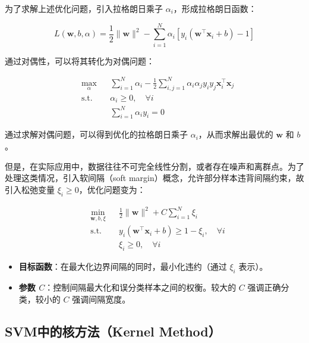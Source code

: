 \documentclass[a4paper,11pt,AutoFakeBold]{ctexart}
\begin{document}
为了求解上述优化问题，引入拉格朗日乘子 $\alpha_i$，形成拉格朗日函数：

\begin{equation}
L(\mathbf{w}, b, \alpha) = \frac{1}{2} \|\mathbf{w}\|^2 - \sum_{i=1}^N \alpha_i \left[ y_i (\mathbf{w}^\top \mathbf{x}_i + b) - 1 \right]
\end{equation}

通过对偶性，可以将其转化为对偶问题：

\begin{equation}
\begin{aligned}
& \underset{\alpha}{\text{max}} && \sum_{i=1}^N \alpha_i - \frac{1}{2} \sum_{i,j=1}^N \alpha_i \alpha_j y_i y_j \mathbf{x}_i^\top \mathbf{x}_j \\
& \text{s.t.} && \alpha_i \geq 0, \quad \forall i \\
& && \sum_{i=1}^N \alpha_i y_i = 0
\end{aligned}
\end{equation}

通过求解对偶问题，可以得到优化的拉格朗日乘子 $\alpha_i$，从而求解出最优的 $\mathbf{w}$ 和 $b$。

但是，在实际应用中，数据往往不可完全线性分割，或者存在噪声和离群点。为了处理这类情况，引入软间隔（soft margin）概念，允许部分样本违背间隔约束，故引入松弛变量 $\xi_i \geq 0$，优化问题变为：

\begin{equation}
\begin{aligned}
& \underset{\mathbf{w}, b, \xi}{\text{min}} && \frac{1}{2} \|\mathbf{w}\|^2 + C \sum_{i=1}^N \xi_i \\
& \text{s.t.} && y_i (\mathbf{w}^\top \mathbf{x}_i + b) \geq 1 - \xi_i, \quad \forall i \\
& && \xi_i \geq 0, \quad \forall i
\end{aligned}
\end{equation}

\begin{itemize}
    \item \textbf{目标函数}：在最大化边界间隔的同时，最小化违约（通过 $\xi_i$ 表示）。
    \item \textbf{参数 $C$}：控制间隔最大化和误分类样本之间的权衡。较大的 $C$ 强调正确分类，较小的 $C$ 强调间隔宽度。
\end{itemize}

\subsection{SVM中的核方法（Kernel Method）}
\end{document}
